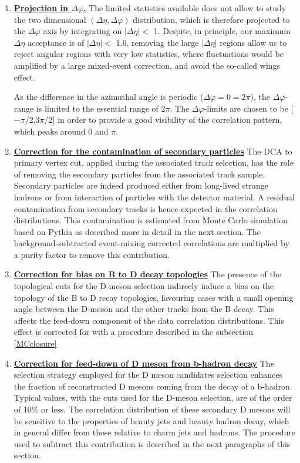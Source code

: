 \begin{enumerate}
\item
\underline{\bf Projection in $\Delta\varphi$.}
The limited statistics available does not allow to study the two dimensional
$(\Delta\eta,\Delta\varphi)$ distribution, which is therefore projected to the $\Delta\varphi$ axis by integrating on $|\Delta\eta| <$ 1. Despite, in principle, our maximum $\Delta\eta$ acceptance is of $|\Delta\eta| <$ 1.6, removing the large $|\Delta\eta|$ regions allow us to reject angular regions with very low statistics, where fluctuations would be amplified by a large mixed-event correction, and avoid the so-called wings effect.

As the difference in the azimuthal angle is periodic ($\Delta \varphi = 0 = 2\pi$), the $\Delta\varphi$-range is limited to the essential range of 2$\pi$. The $\Delta \varphi$-limits are chosen to be [$-\pi$/2,3$\pi$/2] in order to provide a good visibility of the correlation pattern, which peaks around 0 and $\pi$.

\item
\underline{\bf Correction for the contamination of secondary particles}
The DCA to primary vertex cut, applied during the associated track selection, has the role of removing the secondary particles from the associated track sample.
Secondary particles are indeed produced either from long-lived strange hadrons or from interaction of particles with the detector material. A residual contamination from secondary tracks is hence expected in the correlation distributions. This contamination is estimated from Monte Carlo simulation
based on Pythia as described more in detail in the next section. The background-subtracted
event-mixing corrected correlations are multiplied by a purity factor to remove this contribution.

\item
\underline{\bf Correction for bias on B to D decay topologies}
The presence of the topological cuts for the D-meson selection indirecly induce a bias on the topology of the B to D recay topologies, favouring cases with a small opening angle between the D-meson and the other tracks from the B decay. This affects the feed-down component of the data correlation distributions. This effect is corrected for with a procedure described in the subsection \ref{MCclosure}

\item
\underline{\bf Correction for feed-down of D meson from b-hadron decay}
The selection strategy employed for the D meson candidates selection %
enhances the fraction of reconstructed D mesons coming from the decay of a b-hadron. Typical values, with the cuts used for the D-meson selection, are of the order of 10\% or less. The correlation distribution of these secondary D mesons will be sensitive to the properties of beauty jets and beauty hadron decay, which in general differ from those relative to charm jets and hadrons. The procedure used to subtract this contribution is described in the next paragraphs of this section.


\end{enumerate}

